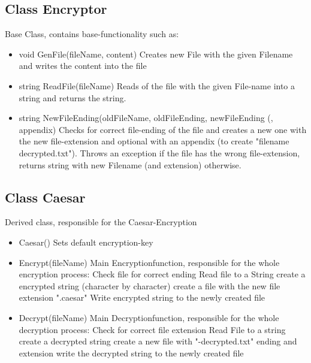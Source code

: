 \subsection{Class Encryptor}
Base Class, contains base-functionality such as:
\begin{itemize}
\item void GenFile(fileName, content)
\subitem Creates new File with the given Filename and writes the content into the file

\item string ReadFile(fileName)
\subitem Reads of the file with the given File-name into a string and returns the string.

\item string NewFileEnding(oldFileName, oldFileEnding, newFileEnding (, appendix)
\subitem Checks for correct file-ending of the file and creates a new one with the new file-extension and optional with an appendix (to create "filename decrypted.txt"). Throws an exception if the file has the wrong file-extension, returns string with new Filename (and extension) otherwise.
\end{itemize}

\subsection{Class Caesar}
Derived class, responsible for the Caesar-Encryption
\begin{itemize}
	\item Caesar()
	\subitem Sets default encryption-key
	
	\item Encrypt(fileName)
	\subitem Main Encryptionfunction, responsible for the whole encryption process:
	\subsubitem Check file for correct ending
	\subsubitem Read file to a String
	\subsubitem create a encrypted string (character by character)
	\subsubitem create a file with the new file extension ".caesar" 
	\subsubitem Write encrypted string to the newly created file
	
	\item Decrypt(fileName)
	\subitem Main Decryptionfunction, responsible for the whole decryption process:
	\subsubitem Check for correct file extension
	\subsubitem Read File to a string
	\subsubitem create a decrypted string
	\subsubitem create a new file with "-decrypted.txt" ending and extension
	\subsubitem write the decrypted string to the newly created file
\end{itemize}
